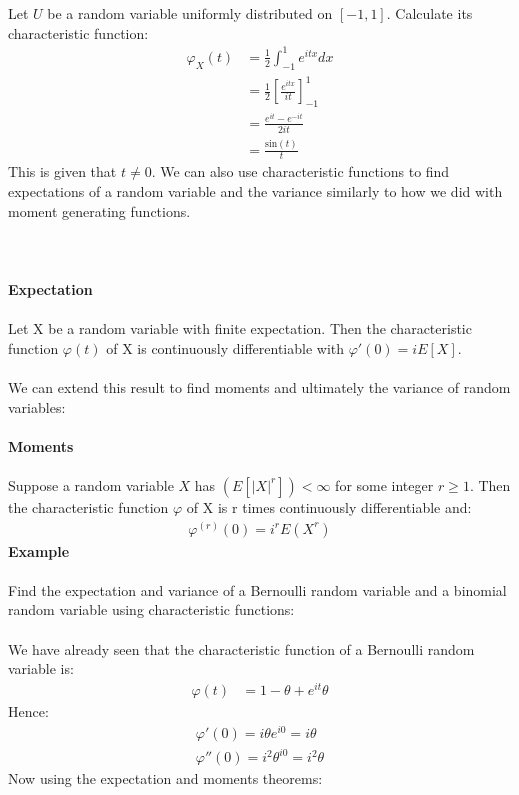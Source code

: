 \documentclass[,oneside]{article}
\begin{document}
\begin{enumerate}
Let $U$ be a random variable uniformly distributed on $[-1,1]$. Calculate its characteristic function:
\begin{align*}
\varphi_X(t)&= \frac{1}{2} \int_{-1}^{1}e^{itx}dx\\
&=\frac{1}{2} \left [ \frac{e^{itx}}{it}\right ]_{-1}^{1}\\
&= \frac{e^{it}-e^{-it}}{2it}\\
&=\frac{\text{sin}(t)}{t}
\end{align*}
This is given that $t \neq 0$. We can also use characteristic functions to find expectations of a random variable and the variance similarly to how we did with moment generating functions. \\ \\ \\ \\
\textbf{Expectation}\\ \\
Let X be a random variable with finite expectation. Then the characteristic function $\varphi(t)$ of X is continuously differentiable with $\varphi '(0)=iE[X]$.\\ \\
We can extend this result to find moments and ultimately the variance of random variables:\\ \\
\textbf{Moments}\\ \\
Suppose a random variable $X$ has $(E[|X|^r]) < \infty $ for some integer $r \geq 1.$ Then the characteristic function $\varphi$ of X is r times continuously differentiable and:
\begin{align*}
\varphi^{(r)}(0)=i^r E(X^r)
\end{align*}
\textbf{Example}\\ \\
Find the expectation and variance of a Bernoulli random variable and a binomial random variable using characteristic functions:\\ \\
We have already seen that the characteristic function of a Bernoulli random variable is:
\begin{align*}
\varphi(t)&= 1-\theta+e^{it}\theta
\end{align*}
Hence:
\begin{align*}
\varphi '(0)=i\theta e^{i0}=i\theta\\
\varphi ''(0)=i^2\theta^{i0}=i^2\theta
\end{align*}
Now using the expectation and moments theorems:

\end{enumerate}
\end{document}
